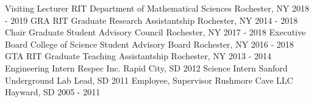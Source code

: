 \begin{cvhonors}
  \cvhonor
    {Visiting Lecturer}
    {RIT Department of Mathematical Sciences}
    {Rochester, NY}
    {2018 - 2019}
  \cvhonor
    {GRA}
    {RIT Graduate Research Assistantship }
    {Rochester, NY}
    {2014 - 2018}
  \cvhonor
    {Chair}
    {Graduate Student Advisory Council}
    {Rochester, NY}
    {2017 - 2018}
  \cvhonor
    {Executive Board}
    {College of Science Student Advisory Board}
    {Rochester, NY}
    {2016 - 2018}   
  \cvhonor
    {GTA}
    {RIT Graduate Teaching Assistantship }
    {Rochester, NY}
    {2013 - 2014}
  \cvhonor
    {Engineering Intern}
    {Respec Inc.}
    {Rapid City, SD}
    {2012}
  \cvhonor
    {Science Intern}
    {Sanford Underground Lab}
    {Lead, SD}
    {2011}
   \cvhonor
    {Employee, Supervisor}
    {Rushmore Cave LLC}
    {Hayward, SD}
    {2005 - 2011}
\end{cvhonors}


